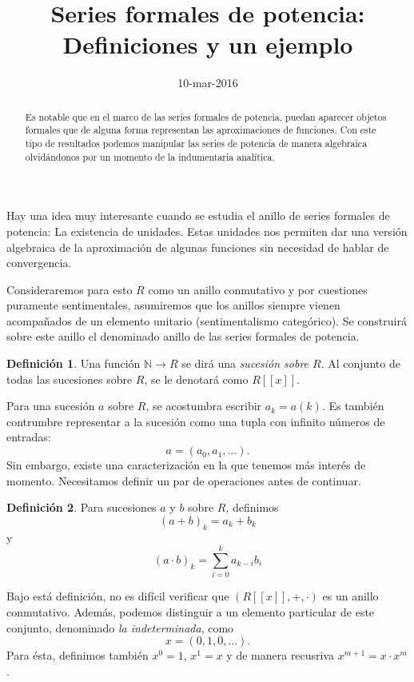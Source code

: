 \documentclass[letter,10pt,notitlepage]{amsart}
\title{Series formales de potencia: Definiciones y un ejemplo }
\date{10-mar-2016}
\theoremstyle{definition}
\newtheorem{definition}{Definición}
\theoremstyle{remark}
\begin{document}
\begin{abstract}
  Es notable que en el marco de las series
  formales de potencia, puedan aparecer
  objetos formales que de alguna forma representan
  las aproximaciones de funciones. Con este tipo
  de resultados podemos manipular las series
  de potencia de manera algebraica olvidándonos 
  por un momento de la indumentaria analítica.
\end{abstract}
\maketitle

Hay una idea muy interesante cuando se
estudia el anillo de series formales de potencia:
La existencia de unidades. Estas unidades nos 
permiten dar una versión algebraica de la aproximación
de algunas funciones sin necesidad de hablar de
convergencia.

Consideraremos para esto \( R\) 
como un anillo conmutativo y por cuestiones puramente 
sentimentales, asumiremos que los anillos siempre vienen 
acompañados de un elemento unitario (sentimentalismo categórico). 
Se construirá sobre este anillo el denominado anillo 
de las series formales de potencia.

\begin{definition}
  Una función \( \mathbb{N} \to R \) se dirá una 
  \emph{sucesión sobre \( R\)}. Al conjunto de todas 
  las sucesiones sobre \(R\), se le denotará como 
  \( R[[x]]\).
\end{definition}

Para una sucesión \(a\) sobre \(R\), se acostumbra 
escribir \(a_k = a(k)\). Es también contrumbre representar
a la sucesión como una tupla con infinito números de 
entradas:
\[ a = (a_0,a_1, \dots ).\]
Sin embargo, existe una caracterización en la que tenemos 
más interés de momento. Necesitamos definir un par de 
operaciones antes de continuar.

\begin{definition}
  \label{OP}
  Para sucesiones \(a\) y \(b\) sobre \(R\), definimos
  \[ (a + b)_k = a_k + b_k \]
  y
  \[ (a \cdot b)_k = \sum_{i=0}^ka_{k-i}b_{i}\]
\end{definition}

Bajo está definición, no es difícil verificar que 
\( (R[[x]],+,\cdot) \) es un anillo conmutativo. 
Además, podemos distinguir a un elemento particular
de este conjunto, denominado
\emph{la indeterminada}, como
\[ x = (0,1,0,\ldots).\]
Para ésta, definimos también \( x^0 = 1\), \( x^1 = x\) y
de manera recusriva \( x^{m+1} = x \cdot x^m \).
\end{document}
